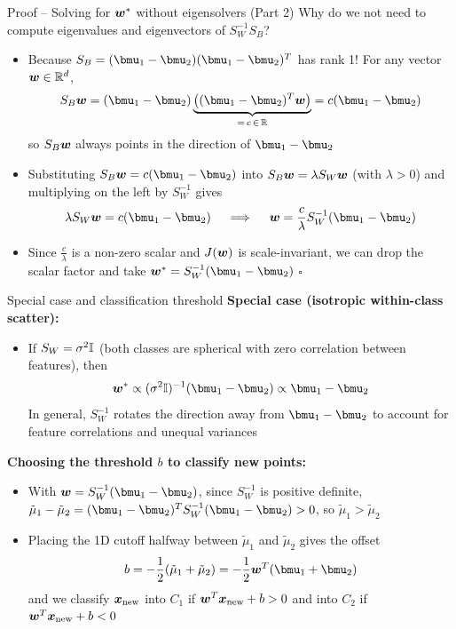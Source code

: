 \documentclass[aspectratio=169]{beamer}\usepackage[]{graphicx}\usepackage[]{xcolor}
\begin{document}
\begin{frame}[red]{Proof -- Solving for $\bm{w}^*$ without eigensolvers (Part 2)}
    Why do we not need to compute eigenvalues and eigenvectors of $S_W^{-1} S_B$?
    \vfill
    \begin{itemize}
        \item Because $S_B = (\bmu_1 - \bmu_2)(\bmu_1 - \bmu_2)^T$ has rank 1! For any vector $\bm{w} \in \mathbb{R}^d$,
        \[
            S_B \bw = (\bmu_1 - \bmu_2)\underbrace{\left((\bmu_1 - \bmu_2)^T \bw\right)}_{= \, c \, \in \, \IR} = c(\bmu_1 - \bmu_2)
        \]
        so $S_B \bm{w}$ always points in the direction of $\bmu_1 - \bmu_2$
        \vfill
        \item Substituting $S_B \bw = c(\bmu_1 - \bmu_2)$ into $S_B \bm{w} = \lambda S_W \bm{w}$ (with $\lambda > 0$) and multiplying on the left by $S_W^{-1}$ gives
        \[
            \lambda S_W \bw = c(\bmu_1 - \bmu_2) \quad \implies \quad \bw = \frac{c}{\lambda} S_W^{-1}(\bmu_1 - \bmu_2)
        \]
        \vfill
        \item Since $\frac{c}{\lambda}$ is a non-zero scalar and $J(\bm{w})$ is scale-invariant, we can drop the scalar factor and take $\bw^* = S_W^{-1}(\bmu_1 - \bmu_2)$ \hfill $\square$
    \end{itemize}
\end{frame}


\begin{frame}{Special case and classification threshold}
    \textbf{Special case (isotropic within-class scatter):}
    \begin{itemize}
        \item If $S_W = \sigma^2 \mathbb{I}$ (both classes are spherical with zero correlation between features), then
        \[
            \bw^* \propto (\sigma^2 \II)^{-1}(\bmu_1 - \bmu_2) \propto \bmu_1 - \bmu_2
        \]
        In general, $S_W^{-1}$ rotates the direction away from $\bmu_1 - \bmu_2$ to account for feature correlations and unequal variances
    \end{itemize}
    \vfill
    \textbf{Choosing the threshold $b$ to classify new points:}
    \begin{itemize}
        \item With $\bw = S_W^{-1}(\bmu_1 - \bmu_2)$, since $S_W^{-1}$ is positive definite, $\tilde{\mu}_1 - \tilde{\mu}_2 = (\bmu_1 - \bmu_2)^T S_W^{-1}(\bmu_1 - \bmu_2) > 0$, so $\tilde{\mu}_1 > \tilde{\mu}_2$
        \item Placing the 1D cutoff halfway between $\tilde{\mu}_1$ and $\tilde{\mu}_2$ gives the offset
        \[
            b = -\frac{1}{2}(\tilde{\mu}_1 + \tilde{\mu}_2) = -\frac{1}{2}\bw^T(\bmu_1 + \bmu_2)
        \]
        and we classify $\bm{x}_{\text{new}}$ into $C_1$ if $\bm{w}^T \bm{x}_{\text{new}} + b > 0$ and into $C_2$ if $\bm{w}^T \bm{x}_{\text{new}} + b < 0$
    \end{itemize}
\end{frame}
\end{document}
